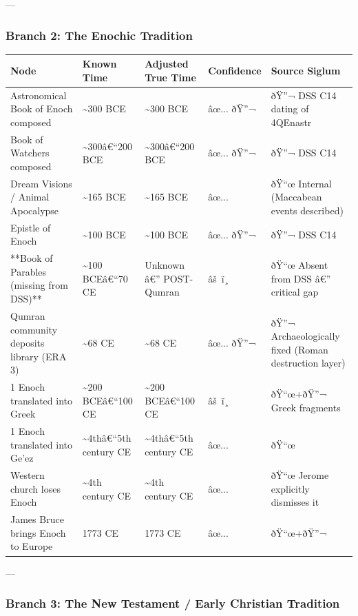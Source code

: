 \documentclass[aps,prd,11pt,onecolumn,superscriptaddress,nofootinbib,floatfix]{revtex4-2}
\begin{document}
---


\subsubsection{Branch 2: The Enochic Tradition}


\begin{table}[h!]
\centering
\begin{tabular}{p{3cm}p{3cm}p{3cm}p{3cm}p{3cm}}
\hline
Node & Known Time & Adjusted True Time & Confidence & Source Siglum \\
\hline
Astronomical Book of Enoch composed & \textasciitilde{}300 BCE & \textasciitilde{}300 BCE & âœ... ðŸ''¬ & ðŸ''¬ DSS C14 dating of 4QEnastr \\
Book of Watchers composed & \textasciitilde{}300â€``200 BCE & \textasciitilde{}300â€``200 BCE & âœ... ðŸ''¬ & ðŸ''¬ DSS C14 \\
Dream Visions / Animal Apocalypse & \textasciitilde{}165 BCE & \textasciitilde{}165 BCE & âœ... & ðŸ``œ Internal (Maccabean events described) \\
Epistle of Enoch & \textasciitilde{}100 BCE & \textasciitilde{}100 BCE & âœ... ðŸ''¬ & ðŸ''¬ DSS C14 \\
**Book of Parables (missing from DSS)** & \textasciitilde{}100 BCEâ€``70 CE & Unknown â€'' POST-Qumran & âš ï¸ & ðŸ``œ Absent from DSS â€'' critical gap \\
Qumran community deposits library (ERA 3) & \textasciitilde{}68 CE & \textasciitilde{}68 CE & âœ... ðŸ''¬ & ðŸ''¬ Archaeologically fixed (Roman destruction layer) \\
1 Enoch translated into Greek & \textasciitilde{}200 BCEâ€``100 CE & \textasciitilde{}200 BCEâ€``100 CE & âš ï¸ & ðŸ``œ+ðŸ''¬ Greek fragments \\
1 Enoch translated into Ge'ez & \textasciitilde{}4thâ€``5th century CE & \textasciitilde{}4thâ€``5th century CE & âœ... & ðŸ``œ \\
Western church loses Enoch & \textasciitilde{}4th century CE & \textasciitilde{}4th century CE & âœ... & ðŸ``œ Jerome explicitly dismisses it \\
James Bruce brings Enoch to Europe & 1773 CE & 1773 CE & âœ... & ðŸ``œ+ðŸ''¬ \\
\hline
\end{tabular}
\end{table}



---


\subsubsection{Branch 3: The New Testament / Early Christian Tradition}
\end{document}
